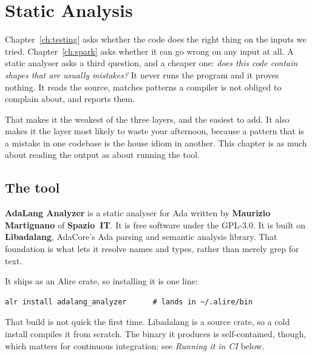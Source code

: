 \chapter{Static Analysis}
\label{ch:analysis}

Chapter~\ref{ch:testing} asks whether the code does the right thing on the inputs we
tried. Chapter~\ref{ch:spark} asks whether it can go wrong on any input at all. A
static analyser asks a third question, and a cheaper one: \emph{does this code contain
shapes that are usually mistakes?} It never runs the program and it proves nothing. It
reads the source, matches patterns a compiler is not obliged to complain about, and
reports them.

That makes it the weakest of the three layers, and the easiest to add. It also makes it
the layer most likely to waste your afternoon, because a pattern that is a mistake in
one codebase is the house idiom in another. This chapter is as much about reading the
output as about running the tool.


\section{The tool}

\textbf{AdaLang Analyzer} is a static analyser for Ada written by
\textbf{Maurizio Martignano} of \textbf{Spazio~IT}. It is free software under the
GPL-3.0. It is built on \textbf{Libadalang}, AdaCore's Ada parsing and semantic
analysis library. That foundation is what lets it resolve names and types, rather
than merely grep for text.

It ships as an Alire crate, so installing it is one line:

\begin{lstlisting}[style=sh]
alr install adalang_analyzer      # lands in ~/.alire/bin
\end{lstlisting}

That build is not quick the first time. Libadalang is a source crate, so a cold install
compiles it from scratch. The binary it produces is self-contained, though, which
matters for continuous integration: see \emph{Running it in CI} below.

